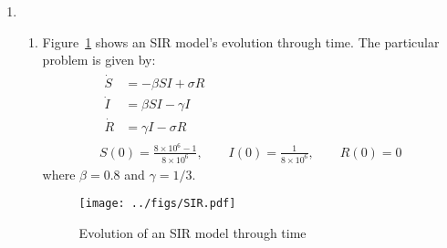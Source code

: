 \documentclass[12pt,a4]{article}
\begin{document}
\begin{enumerate}
\begin{enumerate}
    \end{enumerate}
  \item
    \begin{enumerate}
      \item
        Figure~\ref{fig:SIR} shows an SIR model's evolution through time.
        The particular problem is given by:
        \begin{gather*}
          \begin{split}
            \dot S &= - \beta S I + \sigma R\\
            \dot I &= \beta SI - \gamma I\\
            \dot R &= \gamma I - \sigma R
          \end{split}\\
          S(0) = \frac{8 \times 10 ^ 6 - 1}{8 \times 10^6},\qquad I(0) = \frac{1}{8 \times 10^6}, \qquad R(0) = 0
        \end{gather*}
        where $\beta =  0.8$ and $\gamma = 1 / 3$.
        \begin{figure}[H]
          \centering
          \texttt{[image: ../figs/SIR.pdf]}
          \caption{Evolution of an SIR model through time}
          \label{fig:SIR}
        \end{figure}


\end{enumerate}
\end{enumerate}
\end{document}
